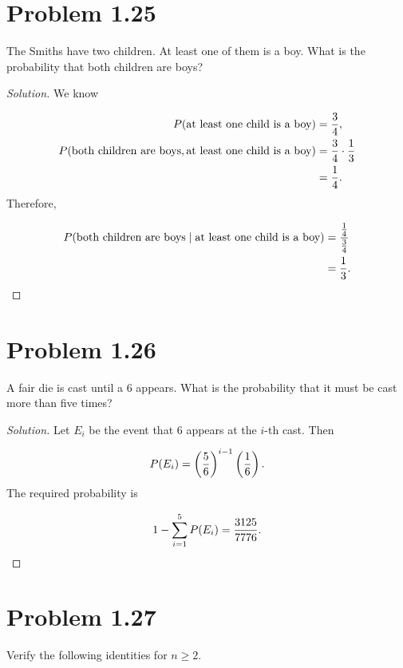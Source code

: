\documentclass[12pt,letterpaper,reqno]{amsart}
\numberwithin{equation}{subsection}
\begin{document}
\newpage
\section{Problem 1.25}

The Smiths have two children. At least one of them is a boy. What is the probability that both children are boys? 

\begin{proof}[Solution]
We know

\begin{align*}
    {P}\! \left( {\mbox{at least one child is a boy}} \right) &= \frac{3}{4}, \\
    {P}\! \left( {\mbox{both children are boys}, \mbox{\mbox{at least one child is a boy}}} \right) &= \frac{3}{4} \cdot \frac{1}{3} \\
                &= \frac{1}{4}.
\end{align*}
Therefore,

\begin{align*}
    {P}\! \left( {\mbox{both children are boys} \mid \mbox{\mbox{at least one child is a boy}}} \right) &= \frac{\frac{1}{4}}{\frac{3}{4}} \\
                      &= \frac{1}{3}.
\end{align*}
\end{proof}

\newpage
\section{Problem 1.26} 

A fair die is cast until a 6 appears. What is the probability that it must be cast more than five times?

\begin{proof}[Solution]
Let $E_i$ be the event that 6 appears at the $i$-th cast. Then

\[ {P}\! \left( {E_i} \right) = \left( \frac{5}{6} \right)^{i-1} \left( \frac{1}{6} \right). \]
The required probability is

\begin{align*}
    1 - \sum_{i=1}^5 {P}\! \left( {E_i} \right) = \frac{3125}{7776}.
\end{align*}
\end{proof}

\newpage
\section{Problem 1.27}

Verify the following identities for $n \geq 2$.
\end{document}
